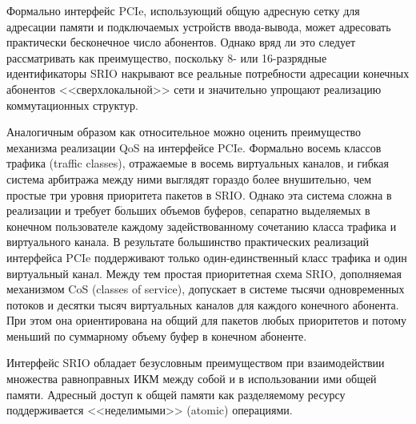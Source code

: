 \begin{multicols}{2}
     Формально интерфейс PCIe, использующий общую адресную сетку для адресации 
памяти и подключаемых устройств ввода-вывода, может адресовать практически 
бесконечное число або\-нентов. Однако вряд ли это следует рассматривать как %
преиму\-ще\-ст\-во, 
поскольку 8- или 16-раз\-ряд\-ные идентификаторы SRIO накрывают все реальные потребности 
адресации конечных абонентов <<сверх\-ло\-каль\-ной>> сети и значительно упрощают 
реализацию коммутационных структур.
     
     Аналогичным образом как относительное можно оценить преимущество механизма 
реализации QoS на интерфейсе PCIe. Формально восемь классов трафика (traffic classes), 
отражаемые в восемь виртуальных каналов, и гибкая система арбитража между ними 
выглядят гораздо более внушительно, чем простые три уровня приоритета пакетов в SRIO. 
Однако эта система сложна в реализации и требует б$\acute{\mbox{о}}$льших объемов 
буферов, сепаратно выделяемых в конечном пользователе каждому задействованному 
сочетанию класса трафика и виртуального канала. В результате большинство практических 
реализаций интерфейса PCIe поддерживают только один-единственный класс трафика и 
один виртуальный канал. Между тем простая приоритетная схема SRIO, дополняемая 
механизмом CoS (classes of service), допускает в системе тысячи одновременных потоков и 
десятки тысяч виртуальных каналов для каждого конечного абонента. При этом она 
ориентирована на общий для пакетов любых приоритетов и потому меньший по суммарному 
объему буфер в конечном абоненте.
     
     Интерфейс SRIO обладает безусловным преимуществом при взаимодействии 
множества равноправных ИКМ между собой и в использовании ими общей памяти. 
Адресный доступ к общей памяти как разделяемому ресурсу поддерживается 
<<неделимыми>> (atomic) операциями. 
\begin{table*}\small
\begin{center}
\vspace{2ex}


\end{center}
\end{table*}
\end{multicols}
